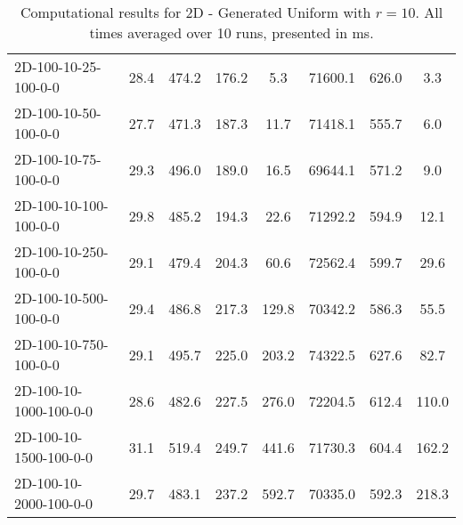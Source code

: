 \documentclass{article}
\begin{document}
\begin{table}[h]
\begin{center}
\begin{tabular}{|l||c|c|c|c|c|c|c|}
            \hline
            2D-100-10-25-100-0-0           & 28.4 & 474.2     & 176.2      & 5.3         & 71600.1  & 626.0     & 3.3        \\
            2D-100-10-50-100-0-0           & 27.7 & 471.3     & 187.3      & 11.7        & 71418.1  & 555.7     & 6.0        \\
            2D-100-10-75-100-0-0           & 29.3 & 496.0     & 189.0      & 16.5        & 69644.1  & 571.2     & 9.0        \\
            2D-100-10-100-100-0-0          & 29.8 & 485.2     & 194.3      & 22.6        & 71292.2  & 594.9     & 12.1       \\
            2D-100-10-250-100-0-0          & 29.1 & 479.4     & 204.3      & 60.6        & 72562.4  & 599.7     & 29.6       \\
            2D-100-10-500-100-0-0          & 29.4 & 486.8     & 217.3      & 129.8       & 70342.2  & 586.3     & 55.5       \\
            2D-100-10-750-100-0-0          & 29.1 & 495.7     & 225.0      & 203.2       & 74322.5  & 627.6     & 82.7       \\
            2D-100-10-1000-100-0-0         & 28.6 & 482.6     & 227.5      & 276.0       & 72204.5  & 612.4     & 110.0      \\
            2D-100-10-1500-100-0-0         & 31.1 & 519.4     & 249.7      & 441.6       & 71730.3  & 604.4     & 162.2      \\
            2D-100-10-2000-100-0-0         & 29.7 & 483.1     & 237.2      & 592.7       & 70335.0  & 592.3     & 218.3      \\
            \hline
        \end{tabular}
    \end{center}
    \caption{Computational results for 2D - Generated Uniform with $r=10$. All times averaged over 10 runs, presented in ms.}
\end{table}
\end{document}
